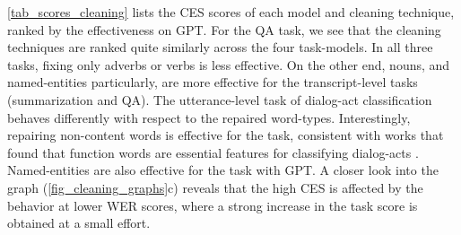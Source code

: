 \autoref{tab_scores_cleaning} lists the CES scores of each model and cleaning technique, ranked by the effectiveness on GPT.
For the QA task, we see that the cleaning techniques are ranked quite similarly across the four task-models. In all three tasks, fixing only adverbs or verbs is less effective. On the other end, nouns, and named-entities particularly, are more effective for the transcript-level tasks (summarization and QA). The utterance-level task of dialog-act classification behaves differently with respect to the repaired word-types. Interestingly, repairing non-content words is effective for the task, consistent with works that found that function words are essential features for classifying dialog-acts \citep{OShea2012daFunction, jo-etal-2017-modeling}.
Named-entities are also effective for the task with GPT. A closer look into the graph (\autoref{fig_cleaning_graphs}c) reveals that the high CES is affected by the behavior at lower WER scores, where a strong increase in the task score is obtained at a small effort.


%




